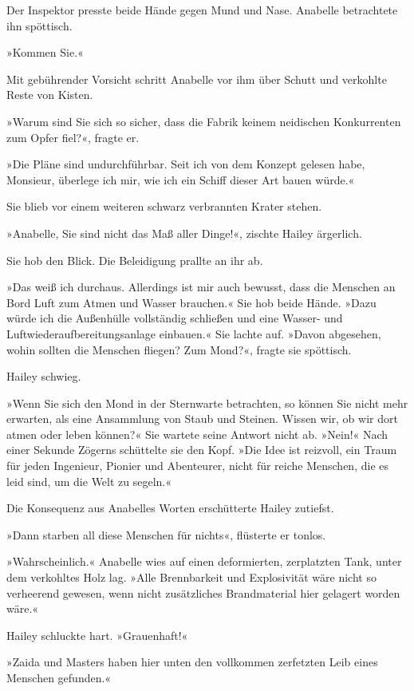 Der Inspektor presste beide Hände gegen Mund und Nase. Anabelle
betrachtete ihn spöttisch.

»Kommen Sie.«

Mit gebührender Vorsicht schritt Anabelle vor ihm über Schutt und
verkohlte Reste von Kisten.

»Warum sind Sie sich so sicher, dass die Fabrik keinem neidischen
Konkurrenten zum Opfer fiel?«, fragte er.

»Die Pläne sind undurchführbar. Seit ich von dem Konzept gelesen
habe, Monsieur, überlege ich mir, wie ich ein Schiff dieser Art
bauen würde.«

Sie blieb vor einem weiteren schwarz verbrannten Krater stehen.

»Anabelle, Sie sind nicht das Maß aller Dinge!«, zischte Hailey
ärgerlich.

Sie hob den Blick. Die Beleidigung prallte an ihr ab.

»Das weiß ich durchaus. Allerdings ist mir auch bewusst, dass die
Menschen an Bord Luft zum Atmen und Wasser brauchen.« Sie hob beide
Hände. »Dazu würde ich die Außenhülle vollständig schließen und
eine Wasser- und Luftwiederaufbereitungsanlage einbauen.« Sie
lachte auf. »Davon abgesehen, wohin sollten die Menschen fliegen?
Zum Mond?«, fragte sie spöttisch.

Hailey schwieg.

»Wenn Sie sich den Mond in der Sternwarte betrachten, so können Sie
nicht mehr erwarten, als eine Ansammlung von Staub und Steinen.
Wissen wir, ob wir dort atmen oder leben können?« Sie wartete seine
Antwort nicht ab. »Nein!« Nach einer Sekunde Zögerns schüttelte sie
den Kopf. »Die Idee ist reizvoll, ein Traum für jeden Ingenieur,
Pionier und Abenteurer, nicht für reiche Menschen, die es leid
sind, um die Welt zu segeln.«

Die Konsequenz aus Anabelles Worten erschütterte Hailey zutiefst.

»Dann starben all diese Menschen für nichts«, flüsterte er tonlos.

»Wahrscheinlich.« Anabelle wies auf einen deformierten, zerplatzten
Tank, unter dem verkohltes Holz lag. »Alle Brennbarkeit und
Explosivität wäre nicht so verheerend gewesen, wenn nicht
zusätzliches Brandmaterial hier gelagert worden wäre.«

Hailey schluckte hart. »Grauenhaft!«

»Zaida und Masters haben hier unten den vollkommen zerfetzten Leib
eines Menschen gefunden.«

